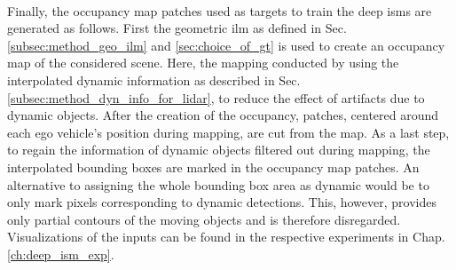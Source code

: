 \\
Finally, the occupancy map patches used as targets to train the deep \gls{ism}s are generated as follows. First the geometric \gls{ilm} as defined in Sec. \ref{subsec:method_geo_ilm} and \ref{sec:choice_of_gt} is used to create an occupancy map of the considered scene. Here, the mapping conducted by using the interpolated dynamic information as described in Sec. \ref{subsec:method_dyn_info_for_lidar}, to reduce the effect of artifacts due to dynamic objects. After the creation of the occupancy, patches, centered around each ego vehicle's position during mapping, are cut from the map. As a last step, to regain the information of dynamic objects filtered out during mapping, the interpolated bounding boxes are marked in the occupancy map patches. An alternative to assigning the whole bounding box area as dynamic would be to only mark pixels corresponding to dynamic detections. This, however, provides only partial contours of the moving objects and is therefore disregarded.
\\
Visualizations of the inputs can be found in the respective experiments in Chap. \ref{ch:deep_ism_exp}.
%
